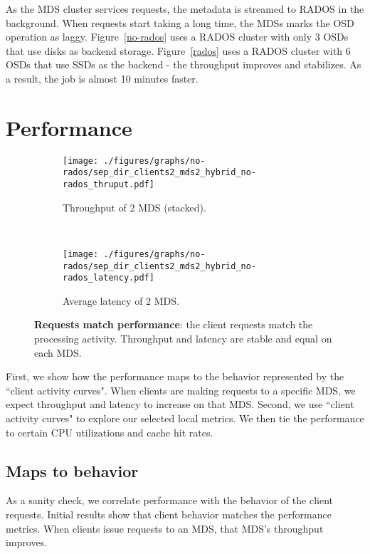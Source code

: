 As the MDS cluster services requests, the metadata is streamed to RADOS in the background. When requests start taking a long time, the MDSs marks the OSD operation as laggy. Figure~\ref{no-rados} uses a RADOS cluster with only 3 OSDs that use disks as backend storage. Figure~\ref{rados} uses a RADOS cluster with 6 OSDs that use SSDs as the backend - the throughput improves and stabilizes. As a result, the job is almost 10 minutes faster. 

\section{Performance}
\begin{figure*}[tbh]
	\begin{subfigure}[H]{0.5\textwidth}
	\centering
	\texttt{[image: ./figures/graphs/no-rados/sep\_dir\_clients2\_mds2\_hybrid\_no-rados\_thruput.pdf]}
	\caption{Throughput of 2 MDS (stacked).}
	\end{subfigure}
	~
	\begin{subfigure}[H]{0.5\textwidth}
	\centering	
	\texttt{[image: ./figures/graphs/no-rados/sep\_dir\_clients2\_mds2\_hybrid\_no-rados\_latency.pdf]} 
	\caption{Average latency of 2 MDS.}
	\end{subfigure}	
	\caption{\textbf{Requests match performance}: the client requests match the processing activity. Throughput and latency are stable and equal on each MDS. \label{performance-2MDS}}
\end{figure*}

First, we show how the performance maps to the behavior represented by the ``client activity curves". When clients are making requests to a specific MDS, we expect throughput and latency to increase on that MDS. Second, we use ``client activity curves" to explore our selected local metrics. We then tie the performance to certain CPU utilizations and cache hit rates.

\subsection{Maps to behavior}
As a sanity check, we correlate performance with the behavior of the client requests. Initial results show that client behavior matches the performance metrics. When clients issue requests to an MDS, that MDS's throughput improves. 

